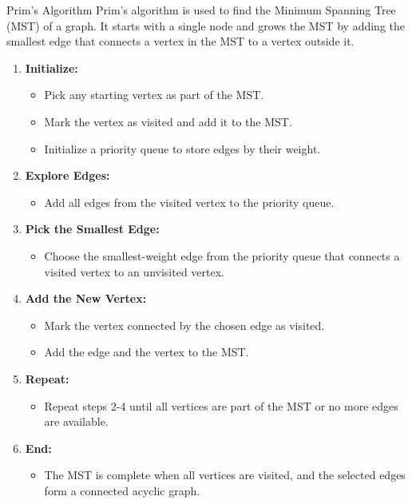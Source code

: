 \begin{usage}[]{Prim's Algorithm}
    Prim's algorithm is used to find the Minimum Spanning Tree (MST) of a graph. It starts with a single node and grows the MST by adding the smallest edge that connects a vertex in the MST to a vertex outside it.

    \begin{enumerate}
        \item \textbf{Initialize:}
              \begin{itemize}
                  \item Pick any starting vertex as part of the MST.
                  \item Mark the vertex as visited and add it to the MST.
                  \item Initialize a priority queue to store edges by their weight.
              \end{itemize}

        \item \textbf{Explore Edges:}
              \begin{itemize}
                  \item Add all edges from the visited vertex to the priority queue.
              \end{itemize}

        \item \textbf{Pick the Smallest Edge:}
              \begin{itemize}
                  \item Choose the smallest-weight edge from the priority queue that connects a visited vertex to an unvisited vertex.
              \end{itemize}

        \item \textbf{Add the New Vertex:}
              \begin{itemize}
                  \item Mark the vertex connected by the chosen edge as visited.
                  \item Add the edge and the vertex to the MST.
              \end{itemize}

        \item \textbf{Repeat:}
              \begin{itemize}
                  \item Repeat steps 2-4 until all vertices are part of the MST or no more edges are available.
              \end{itemize}

        \item \textbf{End:}
              \begin{itemize}
                  \item The MST is complete when all vertices are visited, and the selected edges form a connected acyclic graph.
              \end{itemize}
    \end{enumerate}
\end{usage}
